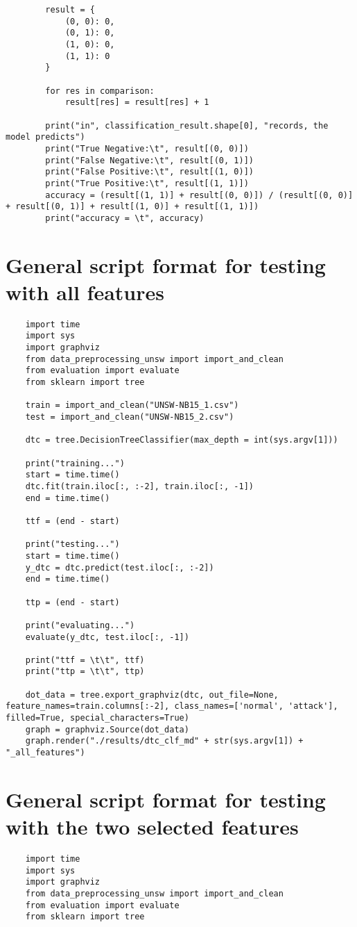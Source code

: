 \begin{appendix}
{\begin{verbatim}
        result = {
            (0, 0): 0,
            (0, 1): 0,
            (1, 0): 0,
            (1, 1): 0
        }

        for res in comparison:
            result[res] = result[res] + 1

        print("in", classification_result.shape[0], "records, the model predicts")
        print("True Negative:\t", result[(0, 0)])
        print("False Negative:\t", result[(0, 1)])
        print("False Positive:\t", result[(1, 0)])
        print("True Positive:\t", result[(1, 1)])
        accuracy = (result[(1, 1)] + result[(0, 0)]) / (result[(0, 0)] + result[(0, 1)] + result[(1, 0)] + result[(1, 1)])
        print("accuracy = \t", accuracy)
\end{verbatim}

\section{General script format for testing with all features}
\begin{verbatim}
    import time
    import sys
    import graphviz
    from data_preprocessing_unsw import import_and_clean
    from evaluation import evaluate
    from sklearn import tree

    train = import_and_clean("UNSW-NB15_1.csv")
    test = import_and_clean("UNSW-NB15_2.csv")

    dtc = tree.DecisionTreeClassifier(max_depth = int(sys.argv[1]))

    print("training...")
    start = time.time()
    dtc.fit(train.iloc[:, :-2], train.iloc[:, -1])
    end = time.time()

    ttf = (end - start)

    print("testing...")
    start = time.time()
    y_dtc = dtc.predict(test.iloc[:, :-2])
    end = time.time()

    ttp = (end - start)

    print("evaluating...")
    evaluate(y_dtc, test.iloc[:, -1])

    print("ttf = \t\t", ttf)
    print("ttp = \t\t", ttp)

    dot_data = tree.export_graphviz(dtc, out_file=None, feature_names=train.columns[:-2], class_names=['normal', 'attack'], filled=True, special_characters=True)
    graph = graphviz.Source(dot_data)
    graph.render("./results/dtc_clf_md" + str(sys.argv[1]) + "_all_features")
\end{verbatim}

\section{General script format for testing with the two selected features}
\begin{verbatim}
    import time
    import sys
    import graphviz
    from data_preprocessing_unsw import import_and_clean
    from evaluation import evaluate
    from sklearn import tree


\end{verbatim}}
\end{appendix}
